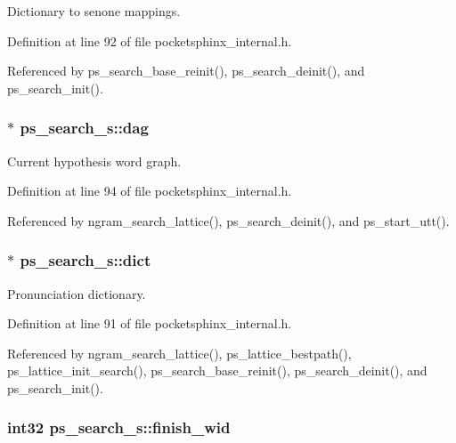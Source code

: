 Dictionary to senone mappings. 



Definition at line 92 of file pocketsphinx\-\_\-internal.\-h.



Referenced by ps\-\_\-search\-\_\-base\-\_\-reinit(), ps\-\_\-search\-\_\-deinit(), and ps\-\_\-search\-\_\-init().

\subsubsection[{dag}]{$\ast$ ps\-\_\-search\-\_\-s\-::dag}\label{structps__search__s_a897f46c55d17e817ff1364f555b31463}


Current hypothesis word graph. 



Definition at line 94 of file pocketsphinx\-\_\-internal.\-h.



Referenced by ngram\-\_\-search\-\_\-lattice(), ps\-\_\-search\-\_\-deinit(), and ps\-\_\-start\-\_\-utt().

\subsubsection[{dict}]{$\ast$ ps\-\_\-search\-\_\-s\-::dict}\label{structps__search__s_a918f243fa966e72c47f697fb9e60089d}


Pronunciation dictionary. 



Definition at line 91 of file pocketsphinx\-\_\-internal.\-h.



Referenced by ngram\-\_\-search\-\_\-lattice(), ps\-\_\-lattice\-\_\-bestpath(), ps\-\_\-lattice\-\_\-init\-\_\-search(), ps\-\_\-search\-\_\-base\-\_\-reinit(), ps\-\_\-search\-\_\-deinit(), and ps\-\_\-search\-\_\-init().

\subsubsection[{finish\-\_\-wid}]{\setlength{\rightskip}{0pt plus 5cm}int32 ps\-\_\-search\-\_\-s\-::finish\-\_\-wid}\label{structps__search__s_a0fb4d79f1084bdbbc0a808513f7c1ca7}


